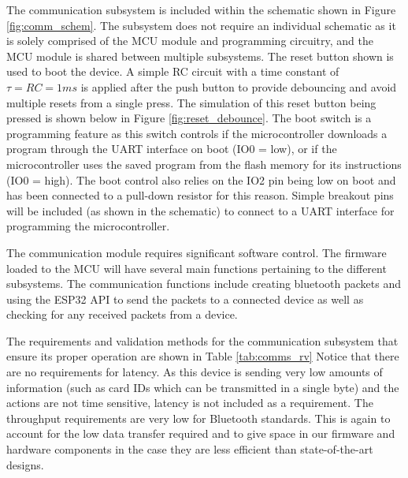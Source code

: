 \documentclass[12pt]{article}
\begin{document}
The communication subsystem is included within the schematic shown in Figure \ref{fig:comm_schem}. The subsystem does not require an individual schematic as it is solely comprised of the MCU module and programming circuitry, and the MCU module is shared between multiple subsystems. The reset button shown is used to boot the device. A simple RC circuit with a time constant of $\tau = RC = 1ms$ is applied after the push button to provide debouncing and avoid multiple resets from a single press. The simulation of this reset button being pressed is shown below in Figure \ref{fig:reset_debounce}. The boot switch is a programming feature as this switch controls if the microcontroller downloads a program through the UART interface on boot (IO0 = low), or if the microcontroller uses the saved program from the flash memory for its instructions (IO0 = high). The boot control also relies on the IO2 pin being low on boot and has been connected to a pull-down resistor for this reason. Simple breakout pins will be included (as shown in the schematic) to connect to a UART interface for programming the microcontroller.

The communication module requires significant software control. The firmware loaded to the MCU will have several main functions pertaining to the different subsystems. The communication functions include creating bluetooth packets and using the ESP32 API to send the packets to a connected device as well as checking for any received packets from a device.

The requirements and validation methods for the communication subsystem that ensure its proper operation are shown in Table \ref{tab:comms_rv} Notice that there are no requirements for latency. As this device is sending very low amounts of information (such as card IDs which can be transmitted in a single byte) and the actions are not time sensitive, latency is not included as a requirement. The throughput requirements are very low for Bluetooth standards. This is again to account for the low data transfer required and to give space in our firmware and hardware components in the case they are less efficient than state-of-the-art designs.
\end{document}
